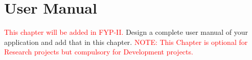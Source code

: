\chapter{User Manual}
\textcolor{red}{This chapter will be added in FYP-II.} Design a complete user manual of your application and add that in this chapter.
\textcolor{red}{NOTE: This Chapter is optional for Research projects but compulsory for Development projects.}\\
